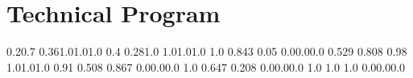 \titleformat{\chapter}{\bf \huge}{\thechapter}{1cm}{}
\chapter{Technical Program}
\vspace{-15mm}


  {0.2}{0.7} {0.36}{1.0}{1.0}{1.0}
   {0.4} {0.28}{1.0} {1.0}{1.0}{1.0}
      {1.0} {0.843} {0.05} {0.0}{0.0}{0.0}
 {0.529} {0.808} {0.98} {1.0}{1.0}{1.0}
   {0.91} {0.508} {0.867} {0.0}{0.0}{0.0}
   {1.0} {0.647} {0.208} {0.0}{0.0}{0.0}
   {1.0} {1.0} {1.0} {0.0}{0.0}{0.0}


\newcommand{\WorkshopsSchedule}[2]{
  \event #1 {0900} {1030} {09:00\\\vspace{0.2em}Workshops #2}        {90~min}                {Wheeler Hall}                   {workshop}
  \event #1 {1030} {1100} {10:30 Break}                              {\vspace{1.5mm}30 min}  {Wheeler Hall}     {break}
  \event #1 {1100} {1230} {11:00\\\vspace{0.2em}Workshops #2}        {90~min}                {Wheeler Hall}                   {workshop}
  \event #1 {1400} {1530} {14:00\\\vspace{0.2em}Workshops #2}        {90~min}                {Wheeler Hall}                   {workshop}
  \event #1 {1530} {1600} {15:30 Break}                              {\vspace{1.5mm}30 min}  {Wheeler Hall}     {break}
  \event #1 {1600} {1730} {16:00\\\vspace{0.2em}Workshops #2}        {90~min}                {Wheeler Hall}                   {workshop}
}

